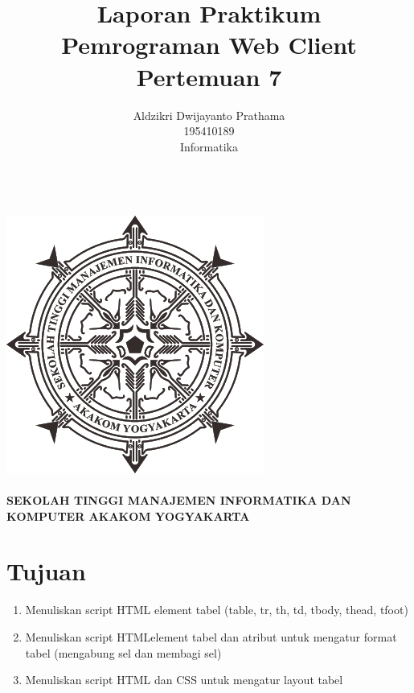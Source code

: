 \documentclass[a4paper,12pt]{article}
\begin{document}
\title{ {\Large Laporan Praktikum}\\ Pemrograman Web Client\\{\Large Pertemuan 7}}

\author{Aldzikri Dwijayanto Prathama 
	\\195410189
	\\Informatika}
\makeatletter
\begin{titlepage}
	\begin{center}
		{\huge \bfseries \@title }\\[14ex]
		\includegraphics[scale=.8]{logo}\\[4ex]
		{\large \@author}\\[12ex]
		{\large \bfseries {SEKOLAH TINGGI MANAJEMEN INFORMATIKA DAN KOMPUTER
				AKAKOM YOGYAKARTA}}
	\end{center}


\end{titlepage}
\makeatother
\renewcommand{\figurename}{Gambar}
\newpage
\tableofcontents
\newpage
\section{Tujuan}
\begin{enumerate}
    \item Menuliskan script HTML element tabel (table, tr, th, td, tbody, thead, tfoot)
    \item Menuliskan script HTMLelement tabel dan atribut untuk mengatur format tabel (mengabung sel dan membagi sel)
    \item Menuliskan script HTML dan CSS untuk mengatur layout tabel
\end{enumerate}
\end{document}
